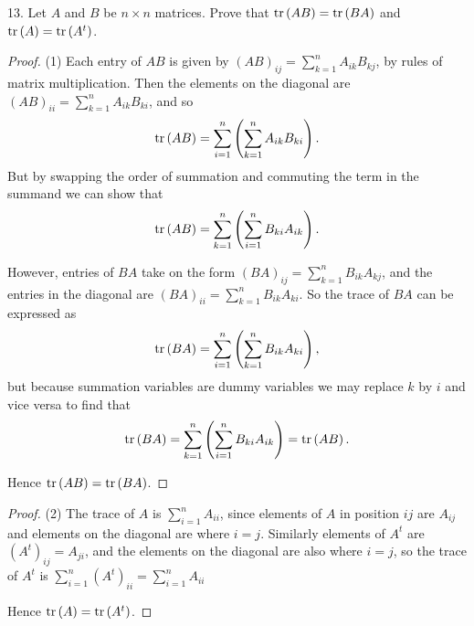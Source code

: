 \documentclass[11pt]{article}
\newcommand{\br}[1]{\left(#1\right)}
\begin{document}
13. Let $A$ and $B$ be $n\times n$ matrices. Prove that $\trace\br{AB} = \trace\br{BA}$ and $\trace\br{A} = \trace\br{A^t}$.

\begin{proof} (1)
    Each entry of $AB$ is given by $(AB)_{ij} = \sum_{k=1}^n A_{ik}B_{kj}$, by rules of matrix multiplication. Then the elements on the diagonal are $(AB)_{ii} = \sum_{k=1}^n A_{ik}B_{ki}$, and so $$\trace\br{AB} = \sum_{i = 1}^n\br{\sum_{k=1}^n A_{ik}B_{ki}}.$$ But by swapping the order of summation and commuting the term in the summand we can show that $$\trace\br{AB} = \sum_{k = 1}^n\br{\sum_{i=1}^n B_{ki}A_{ik}}.$$

    However, entries of $BA$ take on the form $(BA)_{ij} = \sum_{k=1}^n B_{ik}A_{kj}$, and the entries in the diagonal are $(BA)_{ii} = \sum_{k=1}^n B_{ik}A_{ki}$. So the trace of $BA$ can be expressed as $$\trace\br{BA} = \sum_{i=1}^n\br{\sum_{k=1}^n B_{ik}A_{ki}},$$ but because summation variables are dummy variables we may replace $k$ by $i$ and vice versa to find that $$\trace\br{BA} = \sum_{k = 1}^n\br{\sum_{i=1}^n B_{ki}A_{ik}} = \trace\br{AB}.$$

    Hence $\trace\br{AB} = \trace\br{BA}$.
\end{proof}

\begin{proof} (2) The trace of $A$ is $\sum_{i=1}^n A_{ii}$, since elements of $A$ in position $ij$ are $A_{ij}$ and elements on the diagonal are where $i=j$. Similarly elements of $A^t$ are $\br{A^t}_{ij} = A_{ji}$, and the elements on the diagonal are also where $i=j$, so the trace of $A^t$ is $\sum_{i=1}^n \br{A^t}_{ii} = \sum_{i=1}^n A_{ii}$
    
Hence $\trace\br{A} = \trace\br{A^t}$.
\end{proof}
\end{document}
